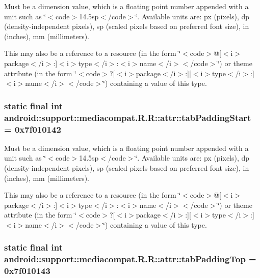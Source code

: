 Must be a dimension value, which is a floating point number appended with a unit such as \char`\"{}$<$code$>$14.5sp$<$/code$>$\char`\"{}. Available units are: px (pixels), dp (density-independent pixels), sp (scaled pixels based on preferred font size), in (inches), mm (millimeters). 

This may also be a reference to a resource (in the form \char`\"{}$<$code$>$@\mbox{[}$<$i$>$package$<$/i$>$:\mbox{]}$<$i$>$type$<$/i$>$:$<$i$>$name$<$/i$>$$<$/code$>$\char`\"{}) or theme attribute (in the form \char`\"{}$<$code$>$?\mbox{[}$<$i$>$package$<$/i$>$:\mbox{]}\mbox{[}$<$i$>$type$<$/i$>$:\mbox{]}$<$i$>$name$<$/i$>$$<$/code$>$\char`\"{}) containing a value of this type. \hypertarget{classandroid_1_1support_1_1mediacompat_1_1_r_1_1attr_595dda8e5f0bd736ca4125475e336915}{
\subsubsection[{tabPaddingStart}]{\setlength{\rightskip}{0pt plus 5cm}static final int android::support::mediacompat.R.R::attr::tabPaddingStart = 0x7f010142}}
\label{classandroid_1_1support_1_1mediacompat_1_1_r_1_1attr_595dda8e5f0bd736ca4125475e336915}


Must be a dimension value, which is a floating point number appended with a unit such as \char`\"{}$<$code$>$14.5sp$<$/code$>$\char`\"{}. Available units are: px (pixels), dp (density-independent pixels), sp (scaled pixels based on preferred font size), in (inches), mm (millimeters). 

This may also be a reference to a resource (in the form \char`\"{}$<$code$>$@\mbox{[}$<$i$>$package$<$/i$>$:\mbox{]}$<$i$>$type$<$/i$>$:$<$i$>$name$<$/i$>$$<$/code$>$\char`\"{}) or theme attribute (in the form \char`\"{}$<$code$>$?\mbox{[}$<$i$>$package$<$/i$>$:\mbox{]}\mbox{[}$<$i$>$type$<$/i$>$:\mbox{]}$<$i$>$name$<$/i$>$$<$/code$>$\char`\"{}) containing a value of this type. \hypertarget{classandroid_1_1support_1_1mediacompat_1_1_r_1_1attr_a914f108314bbb7ad9f58b0a9d82a282}{
\subsubsection[{tabPaddingTop}]{\setlength{\rightskip}{0pt plus 5cm}static final int android::support::mediacompat.R.R::attr::tabPaddingTop = 0x7f010143}}
\label{classandroid_1_1support_1_1mediacompat_1_1_r_1_1attr_a914f108314bbb7ad9f58b0a9d82a282}


